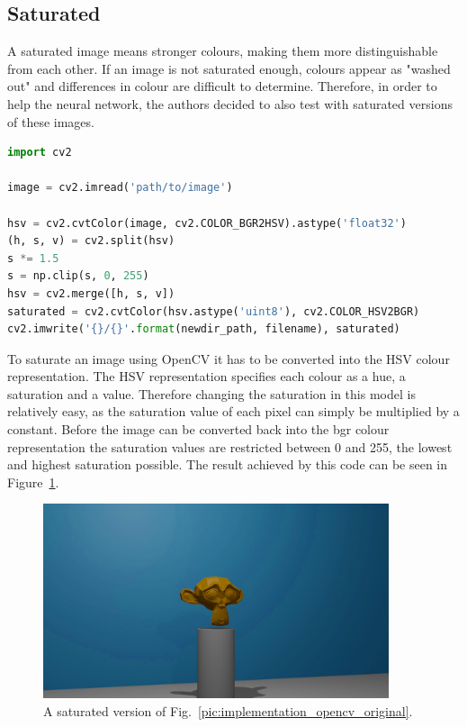 \newpage

\subsection{Saturated}
A saturated image means stronger colours, making them more distinguishable from each other. If an image is not saturated enough, colours appear as "washed out" and differences in colour are difficult to determine. Therefore, in order to help the neural network, the authors decided to also test with saturated versions of these images.

\begin{lstlisting}[language=python]
import cv2

image = cv2.imread('path/to/image')

hsv = cv2.cvtColor(image, cv2.COLOR_BGR2HSV).astype('float32')
(h, s, v) = cv2.split(hsv)
s *= 1.5
s = np.clip(s, 0, 255)
hsv = cv2.merge([h, s, v])
saturated = cv2.cvtColor(hsv.astype('uint8'), cv2.COLOR_HSV2BGR)
cv2.imwrite('{}/{}'.format(newdir_path, filename), saturated)
\end{lstlisting}

To saturate an image using OpenCV it has to be converted into the HSV colour representation. The HSV representation specifies each colour as a hue, a saturation and a value. Therefore changing the saturation in this model is relatively easy, as the saturation value of each pixel can simply be multiplied by a constant. Before the image can be converted back into the bgr colour representation the saturation values are restricted between 0 and 255, the lowest and highest saturation possible. The result achieved by this code can be seen in Figure~\ref{pic:implementation_opencv_saturated}.

\begin{figure}[h!]
	\centering
	\includegraphics[width=4in]{img/implementation_opencv_saturated.jpg}
	\caption{A saturated version of Fig.~\ref{pic:implementation_opencv_original}.}
	\label{pic:implementation_opencv_saturated}
\end{figure}

